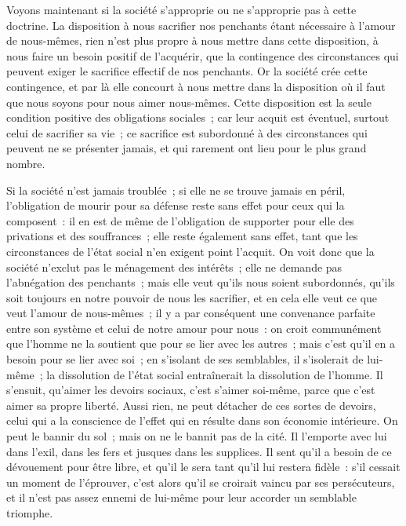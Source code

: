 \documentclass[french,twoside]{book} %
\begin{document}
Voyons maintenant si la société s’approprie ou ne s’approprie pas à cette doctrine. La disposition à nous sacrifier nos penchants étant nécessaire à l’amour de nous-mêmes, rien n’est plus propre à nous mettre dans cette disposition, à nous faire un besoin positif de l’acquérir, que la contingence des circonstances qui peuvent exiger le sacrifice effectif de nos penchants. Or la société crée cette contingence, et par là elle concourt à nous mettre dans la disposition où il faut que nous soyons pour nous aimer nous-mêmes. Cette disposition est la seule condition positive des obligations sociales ; car leur acquit est éventuel, surtout celui de sacrifier sa vie ; ce sacrifice est subordonné à des circonstances qui peuvent ne se présenter jamais, et qui rarement ont lieu pour le plus grand nombre.\par
Si la société n’est jamais troublée ; si elle ne se trouve jamais en péril, l’obligation de mourir pour sa défense reste sans effet pour ceux qui la composent : il en est de même de l’obligation de supporter pour elle des privations et des souffrances ; elle reste également sans effet, tant que les circonstances de l’état social n’en exigent point l’acquit. On voit donc que la société n’exclut pas le ménagement des intérêts ; elle ne demande pas l’abnégation des penchants ; mais elle veut qu’ils nous soient subordonnés, qu’ils soit toujours en notre pouvoir de nous les sacrifier, et en cela elle veut ce que veut l’amour de nous-mêmes ; il y a par conséquent une convenance parfaite entre son système et celui de notre amour pour nous : on croit communément que l’homme ne la soutient que pour se lier avec les autres ; mais c’est qu’il en a besoin pour se lier avec soi ; en s’isolant de ses semblables, il s’isolerait de lui-même ; la dissolution de l’état social entraînerait la dissolution de l’homme. Il s’ensuit, qu’aimer les devoirs sociaux, c’est s’aimer soi-même, parce que c’est aimer sa propre liberté. Aussi rien, ne peut détacher de ces sortes de devoirs, celui qui a la conscience de l’effet qui en résulte dans son économie intérieure. On peut le bannir du sol ; mais on ne le bannit pas de la cité. Il l’emporte avec lui dans l’exil, dans les fers et jusques dans les supplices. Il sent qu’il a besoin de ce dévouement pour être libre, et qu’il le sera tant qu’il lui restera fidèle : s’il cessait un moment de l’éprouver, c’est alors qu’il se croirait vaincu par ses persécuteurs, et il n’est pas assez ennemi de lui-même pour leur accorder un semblable triomphe.\par
\end{document}

